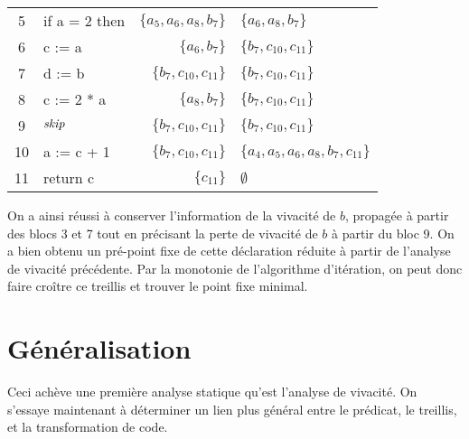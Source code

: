 \documentclass[a4paper, 10pt]{article}
\begin{document}
\begin{example}
\begin{center}
\begin{tabular}{||c|l|r|l||}
	5 & if a = 2 then & $\{a_5, a_6, a_8, b_7\}$ & $\{a_6, a_8, b_7\}$\\
	6 & c := a & $\{a_6, b_7\}$ & $\{b_7, c_{10}, c_{11}\}$\\
	7 & d := b & $\{b_7, c_{10}, c_{11}\}$ & $\{b_7, c_{10}, c_{11}\}$\\
	8 & c := 2 * a & $\{a_8, b_7\}$ & $\{b_7, c_{10}, c_{11}\}$\\
	9 & $\textit{skip}$ & $\{b_7, c_{10}, c_{11}\}$ & $\{b_7, c_{10}, c_{11}\}$\\
	10 & a := c + 1 & $\{b_7, c_{10}, c_{11}\}$ & $\{a_4, a_5, a_6, a_8, b_7, c_{11}\}$\\
	11 & return c & $\{c_{11}\}$ & $\emptyset$\\
	\hline
	\end{tabular}
\end{center}
On a ainsi réussi à conserver l'information de la vivacité de $b$, propagée à partir des blocs 3 et 7 tout en précisant
la perte de vivacité de $b$ à partir du bloc 9.
On a bien obtenu un pré-point fixe de cette déclaration réduite à partir de l'analyse de vivacité précédente.
Par la monotonie de l'algorithme d'itération, on peut donc faire croître ce treillis et trouver le point fixe minimal.
\end{example}
\section{Généralisation}
Ceci achève une première analyse statique qu'est l'analyse de vivacité. On s'essaye maintenant à déterminer
un lien plus général entre le prédicat, le treillis, et la transformation de code.
\end{document}
